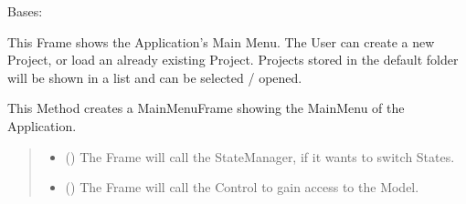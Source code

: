\documentclass[letterpaper,10pt,english]{sphinxmanual}
\begin{document}
\begin{fulllineitems}
\label{\detokenize{apidoc/src.osm_configurator.view.toplevelframes:src.osm_configurator.view.toplevelframes.main_menu_frame.MainMenuFrame}}
\pysigstartsignatures
{}
\pysigstopsignatures
\sphinxAtStartPar
Bases: {\hyperref[\detokenize{apidoc/src.osm_configurator.view.toplevelframes:src.osm_configurator.view.toplevelframes.top_level_frame.TopLevelFrame}]{}}

\sphinxAtStartPar
This Frame shows the Application’s Main Menu.
The User can create a new Project, or load an already existing Project. Projects stored in the default folder
will be shown in a list and can be selected / opened.

\begin{fulllineitems}
\label{\detokenize{apidoc/src.osm_configurator.view.toplevelframes:src.osm_configurator.view.toplevelframes.main_menu_frame.MainMenuFrame.__init__}}
\pysigstartsignatures
{}
\pysigstopsignatures
\sphinxAtStartPar
This Method creates a MainMenuFrame showing the MainMenu of the Application.
\begin{quote}\begin{description}
\begin{itemize}
\item {} 
\sphinxAtStartPar
{} ({\hyperref[\detokenize{apidoc/src.osm_configurator.view.states:src.osm_configurator.view.states.state_manager.StateManager}]{}}) \textendash{} The Frame will call the StateManager, if it wants to switch States.

\item {} 
\sphinxAtStartPar
{} ({\hyperref[\detokenize{apidoc/src.osm_configurator.control:src.osm_configurator.control.control_interface.IControl}]{}}) \textendash{} The Frame will call the Control to gain access to the Model.

\end{itemize}

\end{description}\end{quote}

\end{fulllineitems}


\end{fulllineitems}
\end{document}
